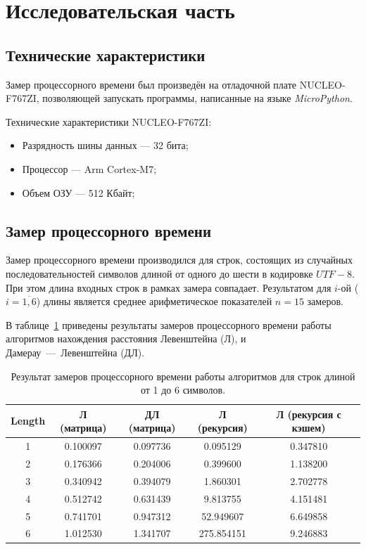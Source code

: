 \section{Исследовательская часть}

\subsection{Технические характеристики}

Замер процессорного времени был произведён на отладочной плате NUCLEO-F767ZI\cite{stm}, позволяющей запускать программы, написанные на языке \textit{MicroPython}\cite{python}.

Технические характеристики NUCLEO-F767ZI:
\begin{itemize}
    \item Разрядность шины данных --- 32 бита;
    \item Процессор --- Arm Cortex-M7;
    \item Объем ОЗУ --- 512 Кбайт;
\end{itemize}

\subsection{Замер процессорного времени}

Замер процессорного времени производился для строк, состоящих из случайных последовательностей символов длиной от одного до шести в кодировке $UTF-8$. При этом длина входных строк в рамках замера совпадает. Результатом для $i$-ой ($i=\overline{1,6}$) длины является среднее арифметическое показателей $n=15$ замеров. 

В таблице~\ref{table:timings} приведены результаты замеров процессорного времени работы алгоритмов нахождения расстояния Левенштейна (Л), и Дамерау~---~Левенштейна (ДЛ).

\begin{table}[htb]
\caption{\centering Результат замеров процессорного времени работы алгоритмов для строк длиной от 1 до 6 символов.}
\small
\centering\begin{tabular}{|c|c|c|c|c|}
    \hline
    \textbf{Length} & \textbf{Л (матрица)} & \textbf{ДЛ (матрица)} & \textbf{Л (рекурсия)} & \textbf{Л (рекурсия с кэшем)} \\
    \hline
    1 & 0.100097 & 0.097736 & 0.095129 & 0.347810 \\
    2 & 0.176366 & 0.204006 & 0.399600 & 1.138200 \\
    3 & 0.340942 & 0.394079 & 1.860301 & 2.702778 \\
    4 & 0.512742 & 0.631439 & 9.813755 & 4.151481 \\
    5 & 0.741701 & 0.947312 & 52.949607 & 6.649858 \\
    6 & 1.012530 & 1.341707 & 275.854151 & 9.246883 \\
    \hline
\end{tabular}
\label{table:timings}
\end{table}


